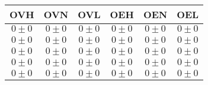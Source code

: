 \begin{tabular}{|c|c|c|c|c|c|}
\hline 
OVH & OVN & OVL & OEH & OEN & OEL\\ 
\hline 
\hline 
$0\pm0$ & $0\pm0$ & $0\pm0$ & $0\pm0$ & $0\pm0$ & $0\pm0$ \\ 
\hline 
$0\pm0$ & $0\pm0$ & $0\pm0$ & $0\pm0$ & $0\pm0$ & $0\pm0$ \\ 
\hline 
$0\pm0$ & $0\pm0$ & $0\pm0$ & $0\pm0$ & $0\pm0$ & $0\pm0$ \\ 
\hline 
$0\pm0$ & $0\pm0$ & $0\pm0$ & $0\pm0$ & $0\pm0$ & $0\pm0$ \\ 
\hline 
$0\pm0$ & $0\pm0$ & $0\pm0$ & $0\pm0$ & $0\pm0$ & $0\pm0$ \\ 
\hline 
\end{tabular}